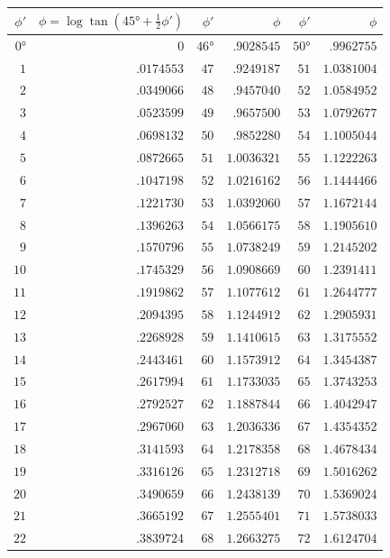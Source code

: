 \documentclass[11pt,a4paper]{book}
\begin{document}
\begin{center}
\tiny
\begin{tabular}{r|r|r|r|r|r}
$\phi'$ & $\phi = \log\tan(45° + \tfrac{1}{2}\phi')$ & $\phi'$ & $\phi$ & $\phi'$ & $\phi$ \\
\hline
$0°$ & $0$ & $46°$ & $.9028545$ & $50°$ & $.9962755$ \\
$1$ & $.0174553$ & $47$ & $.9249187$ & $51$ & $1.0381004$ \\
$2$ & $.0349066$ & $48$ & $.9457040$ & $52$ & $1.0584952$ \\
$3$ & $.0523599$ & $49$ & $.9657500$ & $53$ & $1.0792677$ \\
$4$ & $.0698132$ & $50$ & $.9852280$ & $54$ & $1.1005044$ \\
$5$ & $.0872665$ & $51$ & $1.0036321$ & $55$ & $1.1222263$ \\
$6$ & $.1047198$ & $52$ & $1.0216162$ & $56$ & $1.1444466$ \\
$7$ & $.1221730$ & $53$ & $1.0392060$ & $57$ & $1.1672144$ \\
$8$ & $.1396263$ & $54$ & $1.0566175$ & $58$ & $1.1905610$ \\
$9$ & $.1570796$ & $55$ & $1.0738249$ & $59$ & $1.2145202$ \\
$10$ & $.1745329$ & $56$ & $1.0908669$ & $60$ & $1.2391411$ \\
$11$ & $.1919862$ & $57$ & $1.1077612$ & $61$ & $1.2644777$ \\
$12$ & $.2094395$ & $58$ & $1.1244912$ & $62$ & $1.2905931$ \\
$13$ & $.2268928$ & $59$ & $1.1410615$ & $63$ & $1.3175552$ \\
$14$ & $.2443461$ & $60$ & $1.1573912$ & $64$ & $1.3454387$ \\
$15$ & $.2617994$ & $61$ & $1.1733035$ & $65$ & $1.3743253$ \\
$16$ & $.2792527$ & $62$ & $1.1887844$ & $66$ & $1.4042947$ \\
$17$ & $.2967060$ & $63$ & $1.2036336$ & $67$ & $1.4354352$ \\
$18$ & $.3141593$ & $64$ & $1.2178358$ & $68$ & $1.4678434$ \\
$19$ & $.3316126$ & $65$ & $1.2312718$ & $69$ & $1.5016262$ \\
$20$ & $.3490659$ & $66$ & $1.2438139$ & $70$ & $1.5369024$ \\
$21$ & $.3665192$ & $67$ & $1.2555401$ & $71$ & $1.5738033$ \\
$22$ & $.3839724$ & $68$ & $1.2663275$ & $72$ & $1.6124704$ \\

\end{tabular}
\end{center}
\end{document}

